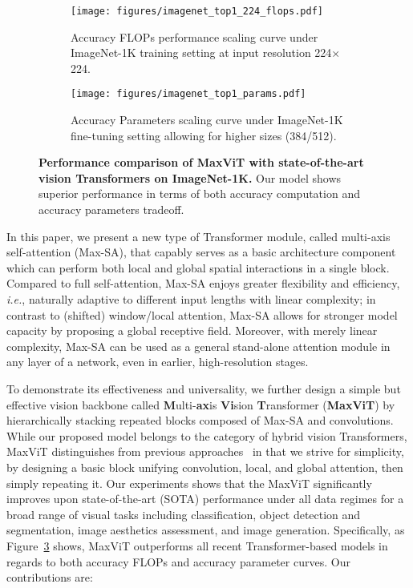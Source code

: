 \documentclass[runningheads]{llncs}
\def\ie{\emph{i.e.}, }
\begin{document}
\begin{figure}[!tb]
 \centering
 \begin{subfigure}[b]{0.49\textwidth}
     \centering
     \texttt{[image: figures/imagenet\_top1\_224\_flops.pdf]}
     \caption{Accuracy \vs FLOPs performance scaling curve under ImageNet-1K training setting at input resolution 224$\times$224.}
     \label{fig:imagenet-flops}
 \end{subfigure}
 \hfill
 \begin{subfigure}[b]{0.49\textwidth}
     \centering
     \texttt{[image: figures/imagenet\_top1\_params.pdf]}
     \caption{Accuracy \vs Parameters scaling curve under ImageNet-1K fine-tuning setting allowing for higher sizes (384/512).}
     \label{fig:three sin x}
 \end{subfigure}
\caption{\textbf{Performance comparison of MaxViT with state-of-the-art vision Transformers on ImageNet-1K.} Our model shows superior performance in terms of both accuracy \vs computation and accuracy \vs parameters tradeoff.}
\label{fig:imagenet-1k-main}
\end{figure}

In this paper, we present a new type of Transformer module, called multi-axis self-attention (Max-SA), that capably serves as a basic architecture component which can perform both local and global spatial interactions in a single block.
Compared to full self-attention, Max-SA enjoys greater flexibility and efficiency, \ie naturally adaptive to different input lengths with linear complexity; in contrast to (shifted) window/local attention, Max-SA allows for stronger model capacity by proposing a global receptive field.
Moreover, with merely linear complexity, Max-SA can be used as a general stand-alone attention module in any layer of a network, even in earlier, high-resolution stages.



To demonstrate its effectiveness and universality, we further design a simple but effective vision backbone called \textbf{M}ulti-\textbf{ax}is \textbf{Vi}sion \textbf{T}ransformer (\textbf{MaxViT}) by hierarchically stacking repeated blocks composed of Max-SA and convolutions.
While our proposed model belongs to the category of hybrid vision Transformers, MaxViT distinguishes from previous approaches~\cite{xiao2021early,dai2021coatnet} in that we strive for simplicity, by designing a basic block unifying convolution, local, and global attention, then simply repeating it.
Our experiments shows that the MaxViT significantly improves upon state-of-the-art (SOTA) performance under all data regimes for a broad range of visual tasks including classification, object detection and segmentation, image aesthetics assessment, and image generation.
Specifically, as Figure~\ref{fig:imagenet-1k-main} shows, MaxViT outperforms all recent Transformer-based models in regards to both accuracy \vs FLOPs and accuracy \vs parameter curves. Our contributions are:
\end{document}
